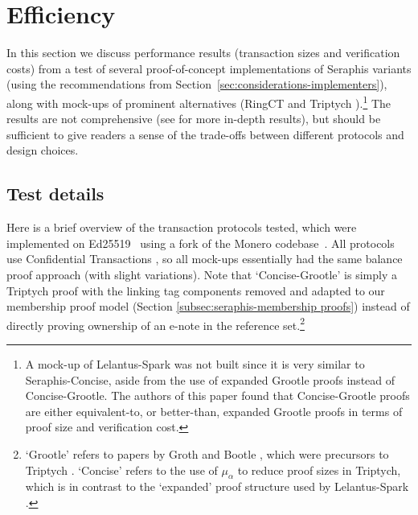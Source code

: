 \section{Efficiency}
\label{sec:efficiency}

In this section we discuss performance results (transaction sizes and verification costs) from a test of several proof-of-concept implementations of Seraphis variants (using the recommendations from Section~\ref{sec:considerations-implementers}), along with mock-ups of prominent alternatives (RingCT \cite{MRL-0005-ringct} and Triptych \cite{triptych-preprint}).\footnote{A mock-up of Lelantus-Spark \cite{lelantus-spark} was not built since it is very similar to Seraphis-Concise, aside from the use of expanded Grootle proofs instead of Concise-Grootle. The authors of this paper found that Concise-Grootle proofs are either equivalent-to, or better-than, expanded Grootle proofs in terms of proof size and verification cost.} The results are not comprehensive (see \cite{seraphis-perf-results-research-issue-91} for more in-depth results), but should be sufficient to give readers a sense of the trade-offs between different protocols and design choices.


\subsection{Test details}
\label{subsec:efficiency-test-details}

Here is a brief overview of the transaction protocols tested, which were implemented on Ed25519~\cite{Bernstein2012-high-speed-high-security-ed25519} using a fork of the Monero codebase~\cite{seraphis-perf-branch}. All protocols use Confidential Transactions \cite{maxwell-ct-2}, so all mock-ups essentially had the same balance proof approach (with slight variations). Note that `Concise-Grootle' is simply a Triptych \cite{triptych-preprint} proof with the linking tag components removed and adapted to our membership proof model (Section \ref{subsec:seraphis-membership proofs}) instead of directly proving ownership of an e-note in the reference set.\footnote{`Grootle' refers to papers by Groth \cite{groth-one-out-of-many} and Bootle \cite{bootle-one-of-many}, which were precursors to Triptych \cite{triptych-preprint}. `Concise' refers to the use of $\mu_{\alpha}$ to reduce proof sizes in Triptych, which is in contrast to the `expanded' proof structure used by Lelantus-Spark \cite{lelantus-spark}.}

